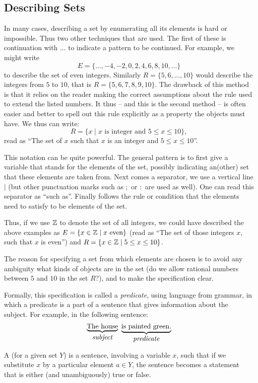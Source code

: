 \subsection{Describing Sets}

In many cases, describing a set by enumerating all its elements is
hard or impossible. Thus two other techniques that are used. The first of
these is continuation with
$\ldots$ to indicate a pattern to be continued. For example, we might write
\[
E=\{\ldots,-4,-2,0,2,4,6,8,10,\ldots\}
\]
to describe the set of even integers. Similarly
$R=\{5,6,\ldots,10\}$ would describe the integers from $5$ to $10$, that is
$R=\{5,6,7,8,9,10\}$. The drawback of this method is that it relies on the
reader making the correct assumptions about the rule used to extend the
listed numbers. It thus -- and this is the second method -- is often easier
and better to spell out this rule explicitly as a property the objects must
have. We thus can write:
\[
R=\{x\mid \mbox{$x$ is integer and $5\le x\le 10$}\},
\]
read as ``The set of $x$ such that $x$ is an integer and $5\le x\le 10$''.

This notation can be quite powerful. The general pattern is to first
give a variable that stands for the elements of the set, possibly indicating
an(other) set that these elements are taken from. Next comes a separator,
we use a vertical line $\mid$ (but other punctuation marks such as $;$ or
$:$ are used as well). One can read this separator as ``such as''.
Finally follows the rule or condition that the elements need to satisfy to
be elements of the set.

Thus, if we use ${\mathbb Z}$ to denote the set of all integers, we could have
described the above examples as
$E=\{x\in{\mathbb Z}\mid \mbox{$x$ even}\}$ (read as ``The set of those integers $x$,
such that $x$ is even'') and $R=\{x\in{\mathbb Z}\mid 5\le x\le 10\}$.

The reason for specifying a set from which elements are chosen is to avoid
any ambiguity what kinds of objects are in the set (do we allow rational
numbers between $5$ and $10$ in the set $R$?), and to make the specification
clear.

Formally, this specification is called a {\em predicate}, using language from
grammar, in which a predicate is a part of a sentence that gives information
about the subject. For example, in the following sentence:
\[
\underbrace{\mbox{The house}}_{\mbox{{\em subject}}}\
\underbrace{\mbox{is painted green.}}_{\mbox{{\em predicate}}}
\]
\begin{defn}
A  (for a given set $Y$) is a sentence, involving a
variable $x$, such that if we substitute $x$ by a particular element $a\in
Y$, the sentence becomes a statement that is either (and unambiguously)
true or false.
\end{defn}

